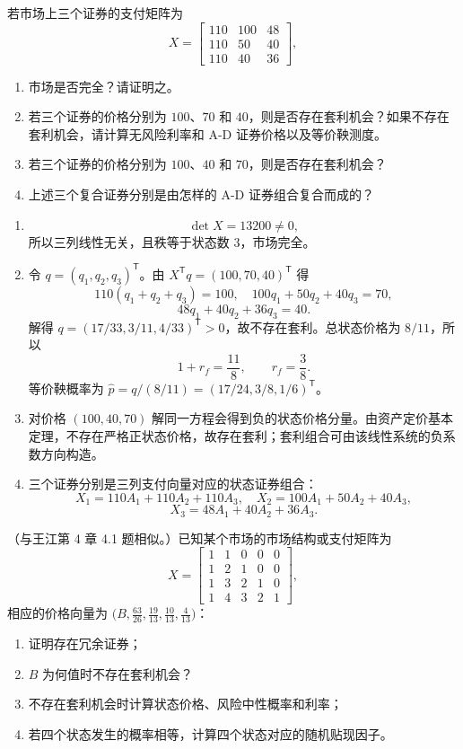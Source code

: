 \begin{problem}
 若市场上三个证券的支付矩阵为
\[
    X=\begin{bmatrix}
        110 & 100 & 48\\
        110 & 50 & 40\\
        110 & 40 & 36
    \end{bmatrix},
\]
\begin{enumerate}[label=(\alph*)]
    \item 市场是否完全？请证明之。
    \item 若三个证券的价格分别为 $100$、$70$ 和 $40$，则是否存在套利机会？如果不存在套利机会，请计算无风险利率和 A-D 证券价格以及等价鞅测度。
    \item 若三个证券的价格分别为 $100$、$40$ 和 $70$，则是否存在套利机会？
    \item 上述三个复合证券分别是由怎样的 A-D 证券组合复合而成的？
\end{enumerate}
\end{problem}
\begin{solution}
\begin{enumerate}[label=(\alph*)]
\item
\[
\det X=13200\ne0,
\]
所以三列线性无关，且秩等于状态数 $3$，市场完全。
\item 令 $q=(q_1,q_2,q_3)^{\mathsf T}$。由 $X^{\mathsf T}q=(100,70,40)^{\mathsf T}$ 得
\[
110(q_1+q_2+q_3)=100,\quad100q_1+50q_2+40q_3=70,
\]
\[
48q_1+40q_2+36q_3=40.
\]
解得 $q=(17/33,3/11,4/33)^{\mathsf T}>0$，故不存在套利。总状态价格为 $8/11$，所以
\[
1+r_f=\frac{11}{8},\qquad r_f=\frac38.
\]
等价鞅概率为 $\widehat p=q/(8/11)=(17/24,3/8,1/6)^{\mathsf T}$。
\item 对价格 $(100,40,70)$ 解同一方程会得到负的状态价格分量。由资产定价基本定理，不存在严格正状态价格，故存在套利；套利组合可由该线性系统的负系数方向构造。
\item 三个证券分别是三列支付向量对应的状态证券组合：
\[
X_1=110A_1+110A_2+110A_3,\quad
X_2=100A_1+50A_2+40A_3,
\]
\[
X_3=48A_1+40A_2+36A_3.
\]
\end{enumerate}
\end{solution}
\begin{problem}
（与王江第 4 章 4.1 题相似。）已知某个市场的市场结构或支付矩阵为
\[
    X=\begin{bmatrix}
        1 & 1 & 0 & 0 & 0\\
        1 & 2 & 1 & 0 & 0\\
        1 & 3 & 2 & 1 & 0\\
        1 & 4 & 3 & 2 & 1
    \end{bmatrix},
\]
相应的价格向量为 $\bigl(B,\frac{63}{26},\frac{19}{13},\frac{10}{13},\frac{4}{13}\bigr)$：
\begin{enumerate}[label=(\alph*)]
    \item 证明存在冗余证券；
    \item $B$ 为何值时不存在套利机会？
    \item 不存在套利机会时计算状态价格、风险中性概率和利率；
    \item 若四个状态发生的概率相等，计算四个状态对应的随机贴现因子。
\end{enumerate}
\end{problem}

